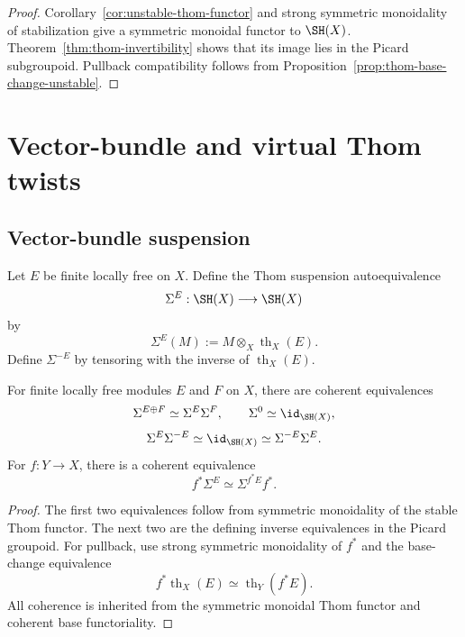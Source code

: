 \begin{proof}
Corollary~\ref{cor:unstable-thom-functor} and strong symmetric monoidality of stabilization give a
symmetric monoidal functor to $\SH(X)$.  Theorem~\ref{thm:thom-invertibility} shows that its image
lies in the Picard subgroupoid.  Pullback compatibility follows from
Proposition~\ref{prop:thom-base-change-unstable}.
\end{proof}

\section{Vector-bundle and virtual Thom twists}
\label{sec:virtual-thom-twists}

\subsection{Vector-bundle suspension}

\begin{definition}
\label{def:vector-bundle-suspension}
Let $E$ be finite locally free on $X$.  Define the Thom suspension autoequivalence
\[
    \Sigma^E:\SH(X)\longrightarrow\SH(X)
\]
by
\[
    \Sigma^E(M)
    :=
    M\otimes_X\operatorname{th}_X(E).
\]
Define $\Sigma^{-E}$ by tensoring with the inverse of $\operatorname{th}_X(E)$.
\end{definition}

\begin{proposition}
\label{prop:vector-bundle-suspension-calculus}
For finite locally free modules $E$ and $F$ on $X$, there are coherent equivalences
\[
    \Sigma^{E\oplus F}
    \simeq
    \Sigma^E\Sigma^F,
    \qquad
    \Sigma^0
    \simeq
    \id_{\SH(X)},
\]
\[
    \Sigma^E\Sigma^{-E}
    \simeq
    \id_{\SH(X)}
    \simeq
    \Sigma^{-E}\Sigma^E.
\]
For $f:Y\to X$, there is a coherent equivalence
\[
    f^*\Sigma^E
    \simeq
    \Sigma^{f^*E}f^*.
\]
\end{proposition}

\begin{proof}
The first two equivalences follow from symmetric monoidality of the stable Thom functor.  The next
two are the defining inverse equivalences in the Picard groupoid.  For pullback, use strong symmetric
monoidality of $f^*$ and the base-change equivalence
\[
    f^*\operatorname{th}_X(E)
    \simeq
    \operatorname{th}_Y(f^*E).
\]
All coherence is inherited from the symmetric monoidal Thom functor and coherent base
functoriality.
\end{proof}

